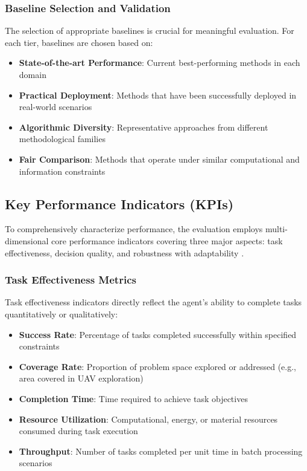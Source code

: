 \subsubsection{Baseline Selection and Validation}

The selection of appropriate baselines is crucial for meaningful evaluation. For each tier, baselines are chosen based on:

\begin{itemize}
\item \textbf{State-of-the-art Performance}: Current best-performing methods in each domain
\item \textbf{Practical Deployment}: Methods that have been successfully deployed in real-world scenarios
\item \textbf{Algorithmic Diversity}: Representative approaches from different methodological families
\item \textbf{Fair Comparison}: Methods that operate under similar computational and information constraints
\end{itemize}

\subsection{Key Performance Indicators (KPIs)}

To comprehensively characterize performance, the evaluation employs multi-dimensional core performance indicators covering three major aspects: task effectiveness, decision quality, and robustness with adaptability \cite{hernandez2022measuring}.

\subsubsection{Task Effectiveness Metrics}

Task effectiveness indicators directly reflect the agent's ability to complete tasks quantitatively or qualitatively:

\begin{itemize}
\item \textbf{Success Rate}: Percentage of tasks completed successfully within specified constraints
\item \textbf{Coverage Rate}: Proportion of problem space explored or addressed (e.g., area covered in UAV exploration)
\item \textbf{Completion Time}: Time required to achieve task objectives
\item \textbf{Resource Utilization}: Computational, energy, or material resources consumed during task execution
\item \textbf{Throughput}: Number of tasks completed per unit time in batch processing scenarios
\end{itemize}


